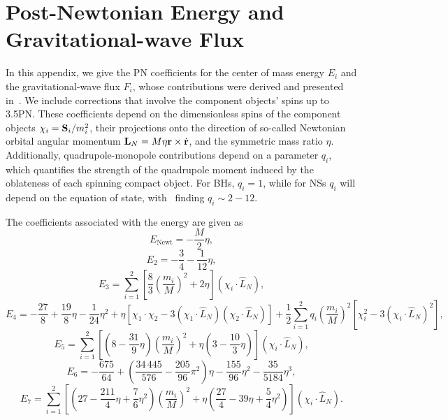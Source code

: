 \section{Post-Newtonian Energy and Gravitational-wave Flux}
\label{app:EF}

In this appendix, we give the \ac{PN} coefficients for the center of mass energy $E_i$ and
the  gravitational-wave  flux $F_i$, whose contributions were derived and presented
in~\cite{Damour:1999cr, Blanchet:2000nv, Blanchet:2001aw, Kidder:1995zr,
Faye:2006gx, Blanchet:2006gy, Poisson:1997ha, Mikoczi:2005dn, Arun:2008kb, 
Marsat:2012fn, Bohe:2012mr, Bohe:2013cla}.  We
include corrections that involve the component objects' spins up to 3.5\ac{PN}.
These coefficients depend on the dimensionless spins of the component objects
$\chi_i={\bf S}_i / m_i^2$, their projections onto the direction of so-called
Newtonian orbital angular momentum ${\bf L}_N= M \eta {\bf r} \times
\dot{\bf{r}}$, and the symmetric mass ratio $\eta$.  Additionally,
quadrupole-monopole contributions depend on a parameter $q_i$, which quantifies
the strength of the quadrupole moment induced by the oblateness of each
spinning compact object. For BHs, $q_i=1$, while for NSs $q_i$ will depend on
the equation of state, with~\cite{Laarakkers:1997hb} finding $q_i \sim 2 - 12$.

The coefficients associated with the energy are
given as
%
\begin{equation}
%
E_{\textrm{Newt}} = -\frac{M}{2}\eta,
%
\end{equation} \begin{equation}
%
E_2 = -\frac{3}{4} - \frac{1}{12}\eta,
%
\end{equation} \begin{equation}
%
E_3 = \sum_{i=1}^2 \left[ \frac{8}{3} \left(\frac{m_i}{M}\right)^2 + 2 \eta \right] \left( \chi_i \cdot \hat{L}_N \right) ,
%
\end{equation} \begin{equation}
%
E_4 = -\frac{27}{8} + \frac{19}{8}\eta - \frac{1}{24}\eta^2 
+ \eta \left[ \chi_1 \cdot \chi_2 - 3 \left( \chi_1 \cdot \hat{L}_N \right) \left(  \chi_2 \cdot \hat{L}_N \right) \right] 
+ \frac{1}{2} \sum_{i=1}^2 q_i \left( \frac{m_i}{M}\right)^2 \left[ \chi_i^2 - 3 \left( \chi_i \cdot \hat{L}_N \right)^2 \right] ,
%
\end{equation} \begin{equation}
%
E_5 = \sum_{i=1}^2 \left[ \left(8 - \frac{31}{9}\eta\right) \left(\frac{m_i}{M}\right)^2 
+ \eta \left( 3 - \frac{10}{3} \eta \right)\right] \left( \chi_i \cdot \hat{L}_N \right) ,
%
\end{equation} \begin{equation}
%
E_6 = -\frac{675}{64} + \left(\frac{34\,445}{576} -\frac{205}{96}
\pi^2\right)\eta - \frac{155}{96}\eta^2 -\frac{35}{5184}\eta^3 ,
%
\end{equation} \begin{equation}
%
E_7 = \sum_{i=1}^2 \left[ \left( 27 - \frac{211}{4}\eta + \frac{7}{6} \eta^2 \right) \left(\frac{m_i}{M}\right)^2
 + \eta \left( \frac{27}{4} - 39 \eta + \frac{5}{4}\eta^2\right) \right] \left( \chi_i \cdot \hat{L}_N \right) .
 \end{equation}

